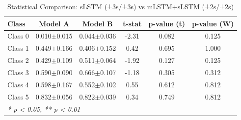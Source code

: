 \begin{table}[htbp]
\centering
\caption{Statistical Comparison: sLSTM (±3s/±3s) vs mLSTM+sLSTM (±2s/±2s)}
\label{tab:comparison_class_slstm_±3s_±3s_vs_mlstmslstm_±2s_±2s}
\begin{tabular}{lccccc}
\toprule
\textbf{Class} & \textbf{Model A} & \textbf{Model B} & \textbf{t-stat} & \textbf{p-value (t)} & \textbf{p-value (W)} \\
\midrule
Class 0 & 0.010$\pm$0.015 & 0.044$\pm$0.036 & -2.31 & 0.082 & 0.125 \\
Class 1 & 0.449$\pm$0.166 & 0.406$\pm$0.152 & 0.42 & 0.695 & 1.000 \\
Class 2 & 0.429$\pm$0.109 & 0.511$\pm$0.064 & -1.92 & 0.127 & 0.125 \\
Class 3 & 0.590$\pm$0.090 & 0.666$\pm$0.107 & -1.18 & 0.305 & 0.312 \\
Class 4 & 0.598$\pm$0.167 & 0.552$\pm$0.102 & 0.55 & 0.612 & 0.812 \\
Class 5 & 0.832$\pm$0.056 & 0.822$\pm$0.039 & 0.34 & 0.749 & 0.812 \\
\bottomrule
\multicolumn{6}{l}{\textit{* p < 0.05, ** p < 0.01}} \\
\end{tabular}
\end{table}